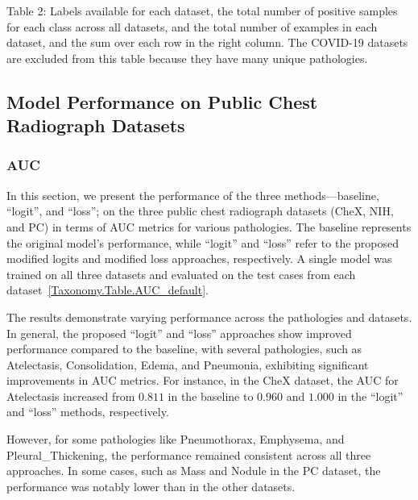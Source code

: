 Table 2: Labels available for each dataset, the total number of positive samples for each class across all datasets, and the total number of examples in each dataset, and the sum over each row in the right column. The COVID-19 datasets are excluded from this table because they have many unique pathologies.


\subsection{Model Performance on Public Chest Radiograph Datasets}

\subsubsection*{AUC}
In this section, we present the performance of the three methods—baseline, ``logit'', and ``loss''; on the three public chest radiograph datasets (CheX, NIH, and PC) in terms of AUC metrics for various pathologies. The baseline represents the original model's performance, while ``logit'' and ``loss'' refer to the proposed modified logits and modified loss approaches, respectively. A single model was trained on all three datasets and evaluated on the test cases from each dataset~\ref{Taxonomy.Table.AUC_default}.

The results demonstrate varying performance across the pathologies and datasets. In general, the proposed ``logit'' and ``loss'' approaches show improved performance compared to the baseline, with several pathologies, such as Atelectasis, Consolidation, Edema, and Pneumonia, exhibiting significant improvements in AUC metrics. For instance, in the CheX dataset, the AUC for Atelectasis increased from $0.811$ in the baseline to $0.960$ and $1.000$ in the ``logit'' and ``loss'' methods, respectively.

However, for some pathologies like Pneumothorax, Emphysema, and Pleural\_Thickening, the performance remained consistent across all three approaches. In some cases, such as Mass and Nodule in the PC dataset, the performance was notably lower than in the other datasets.



